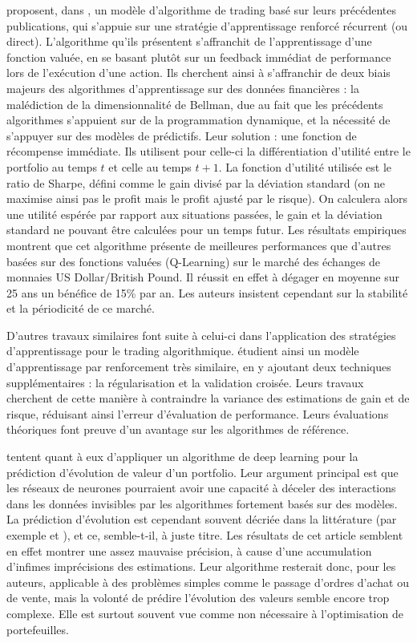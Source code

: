 \documentclass[a4paper, 10pt]{article}
\begin{document}
\textbf{\citet{Moody2001}} proposent, dans \textbf{}, un modèle d'algorithme de trading basé sur leurs précédentes publications, qui s'appuie sur une stratégie d'apprentissage renforcé récurrent (ou direct). L'algorithme qu'ils présentent s'affranchit de l'apprentissage d'une fonction valuée, en se basant plutôt sur un feedback immédiat de performance lors de l'exécution d'une action. Ils cherchent ainsi à s'affranchir de deux biais majeurs des algorithmes d'apprentissage sur des données financières : la malédiction de la dimensionnalité de Bellman, due au fait que les précédents algorithmes s'appuient sur de la programmation dynamique, et la nécessité de s'appuyer sur des modèles de prédictifs. Leur solution : une fonction de récompense immédiate. Ils utilisent pour celle-ci la différentiation d'utilité entre le portfolio au temps $t$ et celle au temps $t+1$. La fonction d'utilité utilisée est le ratio de Sharpe, défini comme le gain divisé par la déviation standard (on ne maximise ainsi pas le profit mais le profit ajusté par le risque). On calculera alors une utilité espérée par rapport aux situations passées,  le gain et la déviation standard ne pouvant être calculées pour un temps futur. Les résultats empiriques montrent que cet algorithme présente de meilleures performances que d'autres basées sur des fonctions valuées (Q-Learning) sur le marché des échanges de monnaies US Dollar/British Pound. Il réussit en effet à dégager en moyenne sur 25 ans un bénéfice de 15\% par an. Les auteurs insistent cependant sur la stabilité et la périodicité de ce marché.

D'autres travaux similaires font suite à celui-ci dans l'application des stratégies d'apprentissage pour le trading algorithmique. \textbf{\citet{Ban2016}} étudient ainsi un modèle d'apprentissage par renforcement très similaire, en y ajoutant deux techniques supplémentaires : la régularisation et la validation croisée. Leurs travaux cherchent de cette manière à contraindre la variance des estimations de gain et de risque, réduisant ainsi l'erreur d'évaluation de performance. Leurs évaluations théoriques font preuve d’un avantage sur les algorithmes de référence.

\textbf{\citet{Heaton2017}} tentent quant à eux d'appliquer un algorithme de deep learning pour la prédiction d'évolution de valeur d'un portfolio. Leur argument principal est que les réseaux de neurones pourraient avoir une capacité à déceler des interactions dans les données invisibles par les algorithmes fortement basés sur des modèles. La prédiction d'évolution est cependant souvent décriée dans la littérature (par exemple \cite{Moody2001} et \cite{Jiang2017}), et ce, semble-t-il, à juste titre. Les résultats de cet article semblent en effet montrer une assez mauvaise précision, à cause d'une accumulation d'infimes imprécisions des estimations. Leur algorithme resterait donc, pour les auteurs, applicable à des problèmes simples comme le passage d'ordres d'achat ou de vente, mais la volonté de prédire l'évolution des valeurs semble encore trop complexe. Elle est surtout souvent vue comme non nécessaire à l'optimisation de portefeuilles.
\end{document}
